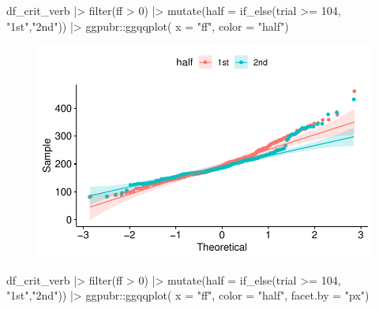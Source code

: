 \documentclass[
  letterpaper,
  DIV=11,
  numbers=noendperiod]{scrartcl}
\newenvironment{Shaded}{\begin{snugshade}}{\end{snugshade}}
\newcommand{\AttributeTok}[1]{\textcolor[rgb]{0.40,0.45,0.13}{#1}}
\newcommand{\DecValTok}[1]{\textcolor[rgb]{0.68,0.00,0.00}{#1}}
\newcommand{\FunctionTok}[1]{\textcolor[rgb]{0.28,0.35,0.67}{#1}}
\newcommand{\NormalTok}[1]{\textcolor[rgb]{0.00,0.23,0.31}{#1}}
\newcommand{\SpecialCharTok}[1]{\textcolor[rgb]{0.37,0.37,0.37}{#1}}
\newcommand{\StringTok}[1]{\textcolor[rgb]{0.13,0.47,0.30}{#1}}
\begin{document}
\begin{Shaded}
\begin{Highlighting}[]
\NormalTok{df\_crit\_verb }\SpecialCharTok{|\textgreater{}} 
  \FunctionTok{filter}\NormalTok{(ff }\SpecialCharTok{\textgreater{}} \DecValTok{0}\NormalTok{) }\SpecialCharTok{|\textgreater{}} 
  \FunctionTok{mutate}\NormalTok{(}\AttributeTok{half =} \FunctionTok{if\_else}\NormalTok{(trial }\SpecialCharTok{\textgreater{}=} \DecValTok{104}\NormalTok{, }\StringTok{"1st"}\NormalTok{,}\StringTok{"2nd"}\NormalTok{)) }\SpecialCharTok{|\textgreater{}} 
\NormalTok{  ggpubr}\SpecialCharTok{::}\FunctionTok{ggqqplot}\NormalTok{( }\AttributeTok{x =} \StringTok{"ff"}\NormalTok{,}
                    \AttributeTok{color =} \StringTok{"half"}\NormalTok{)}
\end{Highlighting}
\end{Shaded}

\begin{figure}[H]

{\centering \includegraphics{_lin_reg1_files/figure-pdf/unnamed-chunk-31-1.pdf}

}

\end{figure}

\begin{Shaded}
\begin{Highlighting}[]
\NormalTok{df\_crit\_verb }\SpecialCharTok{|\textgreater{}} 
  \FunctionTok{filter}\NormalTok{(ff }\SpecialCharTok{\textgreater{}} \DecValTok{0}\NormalTok{) }\SpecialCharTok{|\textgreater{}} 
  \FunctionTok{mutate}\NormalTok{(}\AttributeTok{half =} \FunctionTok{if\_else}\NormalTok{(trial }\SpecialCharTok{\textgreater{}=} \DecValTok{104}\NormalTok{, }\StringTok{"1st"}\NormalTok{,}\StringTok{"2nd"}\NormalTok{)) }\SpecialCharTok{|\textgreater{}} 
\NormalTok{  ggpubr}\SpecialCharTok{::}\FunctionTok{ggqqplot}\NormalTok{( }\AttributeTok{x =} \StringTok{"ff"}\NormalTok{,}
                    \AttributeTok{color =} \StringTok{"half"}\NormalTok{,}
                    \AttributeTok{facet.by =} \StringTok{"px"}\NormalTok{)}
\end{Highlighting}
\end{Shaded}
\end{document}
